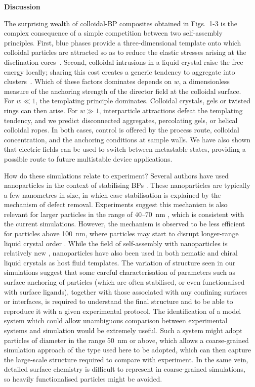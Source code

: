 \documentclass[12pt]{article}
\begin{document}
\medskip
\noindent
\textbf{\large Discussion}

\noindent
The surprising wealth of colloidal-BP composites obtained in Figs.~1-3 is
the complex consequence of a simple competition between two self-assembly
principles. 
First, blue phases provide a three-dimensional template onto which
colloidal particles are attracted so as to reduce the elastic stresses
arising at the disclination cores~\cite{miha}. Second, colloidal intrusions
in a liquid crystal raise the free energy locally; sharing this cost creates
a generic tendency to aggregate into clusters~\cite{tiffany}. Which of these
factors dominates depends on $w$, a dimensionless measure of the anchoring
strength of the director field at the colloidal surface. For $w\ll 1$, the
templating principle dominates. Colloidal crystals, gels or twisted rings
can then arise. For $w \gg 1$, interparticle attractions defeat the
templating tendency, and we predict disconnected aggregates, percolating
gels, or helical colloidal ropes. In both cases, control is offered by the
process route, colloidal concentration, and the anchoring conditions at
sample walls. We have also shown that electric fields can be used to
switch between metastable states, providing a possible route to future
multistable device applications.


How do these simulations relate to experiment? Several authors have
used nanoparticles in the context of stabilising BPs
\cite{yoshida2009,karatairi}. These
nanoparticles are typically a few nanometres in size, in which case
stabilisation is explained by the mechanism of defect removal.
Experiments suggest this mechanism is also
relevant for larger particles in the range of 40--70~nm 
\cite{dierking}, which is consistent with the current simulations.
However, the mechanism is observed to be less efficient for
particles above 100~nm, where particles may start to disrupt
longer-range liquid crystal order \cite{dierking}. While the field of
self-assembly with nanoparticles is relatively new \cite{draper},
nanoparticles have also been used in both nematic \cite{milette2012}
and chiral liquid crystals \cite{cordoyiannis} as host fluid templates.
The variation of structure seen
in our simulations suggest that some careful characterisation of parameters
such as surface anchoring of particles (which are often stabilised, or even
functionalised with surface ligands), together with those associated
with any confining surfaces or interfaces, is required to understand the
final structure and to be able to reproduce it with a given experimental
protocol. The identification of a model system which could allow
unambiguous comparison between experimental systems and simulation
would be extremely useful. Such a system might adopt particles of
diameter in the range 50~nm or above, which allows a coarse-grained simulation
approach of the type used here to be adopted, which can then capture the
large-scale structure required to compare with experiment. In the same vein,
detailed surface chemistry is difficult to represent in coarse-grained
simulations, so heavily functionalised particles might be avoided.
\end{document}
